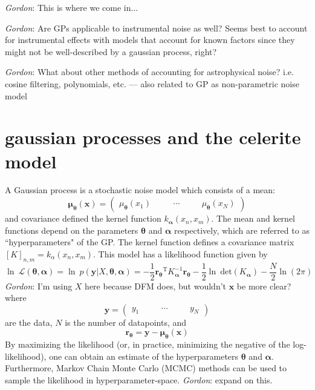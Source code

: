 \documentclass[modern]{aastex62}
\newcommand{\todo}[3]{{\color{#2}\emph{#1}: #3}}
\newcommand{\gordontodo}[1]{\todo{Gordon}{red}{#1}}
\newcommand{\bvec}[1]{{\ensuremath{\boldsymbol{#1}}}}
\newcommand{\T}{\ensuremath{\mathrm{T}}}
\newcommand{\expandvec}[2]{\left(\begin{array}{ccccc} #1\quad && \cdots\quad && #2 \end{array}\right)}
\begin{document}
	\gordontodo{This is where we come in...}
	
	\gordontodo{Are GPs applicable to instrumental noise as well? Seems best to account for instrumental effects with models that account for known factors since 
	they might not be well-described by a gaussian process, right?}
	
	\gordontodo{What about other methods of accounting for astrophysical noise? i.e. cosine filtering, polynomials, etc. --- also related to GP as non-parametric 
	noise model}
		
\section{gaussian processes and the celerite model}
	A Gaussian process is a stochastic noise model which consists of a mean:
	\begin{equation} 
		\bvec{\mu_\theta}(\bvec{x}) = \expandvec{\mu_\bvec{\theta}(x_1)}{\mu_\bvec{\theta}(x_N)}
	\end{equation}
	and covariance defined the kernel function $k_\bvec{\alpha}(x_n, x_m)$. The mean and kernel functions depend on the parameters 
	$\bvec{\theta}$ and $\bvec{\alpha}$ respectively, which are referred to as ``hyperparameters" of the GP. The kernel function defines a covariance matrix 
	$\left[K\right]_{n, m} = k_\alpha(x_n, x_m)$. This model has a likelihood function given by
	\begin{equation}
		\ln\ \mathcal{L(\bvec{\theta}, \bvec{\alpha})} = \ln\ p(\bvec{y}|X, \bvec{\theta}, \bvec{\alpha}) = 
			-\frac{1}{2}\bvec{r_\theta}^\T K_\bvec{\alpha}^{-1}\bvec{r_\theta} 
			-\frac{1}{2}\ln\ \mathrm{det}(K_\bvec{\alpha}) - \frac{N}{2}\ln(2\pi)
	\end{equation}
	\gordontodo{I'm using $X$ here because DFM does, but wouldn't $\bvec{x}$ be more clear?}
	where 
	\begin{equation}
		\bvec{y} = \expandvec{y_1}{y_N}
	\end{equation}
	are the data, $N$ is the number of datapoints, and
	\begin{equation}
		\bvec{r_\theta} = \bvec{y}-\bvec{\mu_\theta}(\bvec{x})
	\end{equation}
	By maximizing the likelihood (or, in practice, minimizing the negative of the log-likelihood), one can obtain an estimate of the hyperparameters $\bvec{\theta}$ and 
	$\bvec{\alpha}$. Furthermore, Markov Chain Monte Carlo (MCMC) methods can be used to sample the likelihood in hyperparameter-space. \gordontodo{expand 
	on this.}
\end{document}
